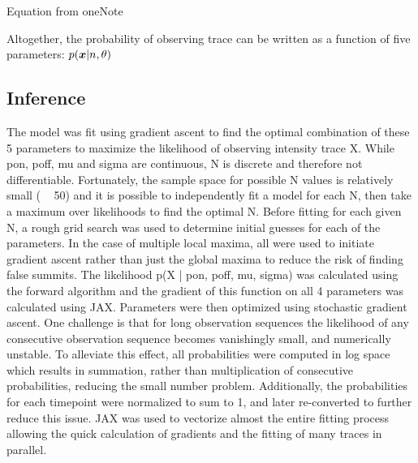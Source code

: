 Equation from oneNote



Altogether, the probability of observing trace \trace can be written as a
function of five parameters: $p(\bm{x}|n,\theta)$

\subsection{Inference}


The model was fit using gradient ascent to find the optimal combination of these 5 parameters to maximize the likelihood of observing intensity trace X. While pon, poff, mu and sigma are continuous, N is discrete and therefore not differentiable. Fortunately, the sample space for possible N values is relatively small ( ~ 50) and it is possible to independently fit a model for each N, then take a maximum over likelihoods to find the optimal N. 
Before fitting for each given N, a rough grid search was used to determine initial guesses for each of the parameters. In the case of multiple local maxima, all were used to initiate gradient ascent rather than just the global maxima to reduce the risk of finding false summits. The likelihood p(X | pon, poff, mu, sigma) was calculated using the forward algorithm and the gradient of this function on all 4 parameters was calculated using JAX. Parameters were then optimized using stochastic gradient ascent.
One challenge is that for long observation sequences the likelihood of any consecutive observation sequence becomes vanishingly small, and numerically unstable. To alleviate this effect, all probabilities were computed in log space which results in summation, rather than multiplication of consecutive probabilities, reducing the small number problem. Additionally, the probabilities for each timepoint were normalized to sum to 1, and later re-converted to further reduce this issue. JAX was used to vectorize almost the entire fitting process allowing the quick calculation of gradients and the fitting of many traces in parallel. 
